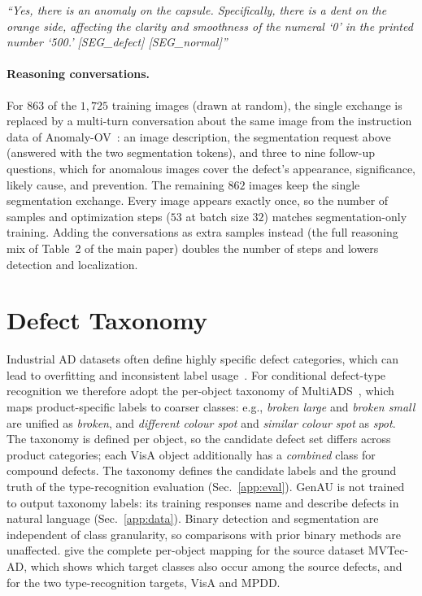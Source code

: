 \textit{``Yes, there is an anomaly on the capsule. Specifically, there is a dent on the orange side, affecting the clarity and smoothness of the numeral `0' in the printed number `500.' [SEG\_defect] [SEG\_normal]''}

\paragraph{Reasoning conversations.} For $863$ of the $1{,}725$ training images (drawn at random), the single exchange is replaced by a multi-turn conversation about the same image from the instruction data of Anomaly-OV~\cite{xu2025towards}: an image description, the segmentation request above (answered with the two segmentation tokens), and three to nine follow-up questions, which for anomalous images cover the defect's appearance, significance, likely cause, and prevention. The remaining $862$ images keep the single segmentation exchange. Every image appears exactly once, so the number of samples and optimization steps ($53$ at batch size $32$) matches segmentation-only training. Adding the conversations as extra samples instead (the full reasoning mix of Table~2 of the main paper) doubles the number of steps and lowers detection and localization.

\section{Defect Taxonomy}
\label{app:taxonomy}
Industrial AD datasets often define highly specific defect categories, which can lead to overfitting and inconsistent label usage~\cite{mokhtar2025detectclassifyactcategorizing}. For conditional defect-type recognition we therefore adopt the per-object taxonomy of MultiADS~\cite{sadikaj2025multiadsdefectawaresupervisionmultitype}, which maps product-specific labels to coarser classes: e.g., \textit{broken large} and \textit{broken small} are unified as \textit{broken}, and \textit{different colour spot} and \textit{similar colour spot} as \textit{spot}. The taxonomy is defined per object, so the candidate defect set differs across product categories; each VisA object additionally has a \emph{combined} class for compound defects. The taxonomy defines the candidate labels and the ground truth of the type-recognition evaluation (Sec.~\ref{app:eval}). GenAU is not trained to output taxonomy labels: its training responses name and describe defects in natural language (Sec.~\ref{app:data}). Binary detection and segmentation are independent of class granularity, so comparisons with prior binary methods are unaffected.  give the complete per-object mapping for the source dataset MVTec-AD, which shows which target classes also occur among the source defects, and for the two type-recognition targets, VisA and MPDD.

